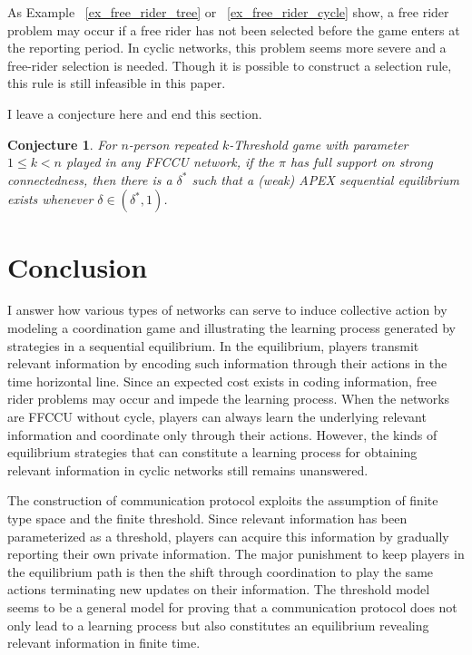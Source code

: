 \documentclass[12pt,letterpaper]{article}
\newtheorem{conjecture}{Conjecture}[section]
\theoremstyle{definition}
\theoremstyle{remark}
\theoremstyle{claim}
\begin{document}
As Example ~\ref{ex_free_rider_tree} or ~\ref{ex_free_rider_cycle} show, a free rider problem may occur if a free rider has not been selected before the game enters at the reporting period. In cyclic networks, this problem seems more severe and a free-rider selection is needed. Though it is possible to construct a selection rule, this rule is still infeasible in this paper. 

I leave a conjecture here and end this section.

\begin{conjecture}
For $n$-person repeated $k$-Threshold game with parameter $1\leq k < n$ played in any FFCCU network,
if the $\pi$ has full support on strong connectedness, then there is a $\delta^{*}$ such that a (weak) APEX sequential equilibrium exists whenever $\delta\in(\delta^{*},1)$.
\end{conjecture}



\section{Conclusion}
\label{sec:con}

I answer how various types of networks can serve to induce collective action by modeling a coordination game and illustrating the learning process generated by strategies in a sequential equilibrium. In the equilibrium, players transmit relevant information by encoding such information through their actions in the time horizontal line. Since an expected cost exists in coding information, free rider problems may occur and impede the learning process. When the networks are FFCCU without cycle, players can always learn the underlying relevant information and coordinate only through their actions. However, the kinds of equilibrium strategies that can constitute a learning process for obtaining relevant information in cyclic networks still remains unanswered.

The construction of communication protocol exploits the assumption of finite type space and the finite threshold. Since relevant information has been parameterized as a threshold, players can acquire this information by gradually reporting their own private information. The major punishment to keep players in the equilibrium path is then the shift through coordination to play the same actions terminating new updates on their information. The threshold model seems to be a general model for proving that a communication protocol  does not only lead to a learning process but also constitutes an equilibrium revealing relevant information in finite time.
\end{document}
